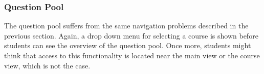 \subsubsection{Question Pool}

The question pool suffers from the same navigation problems described in the previous section. Again, a drop down menu for selecting a course is shown before students can see the overview of the question pool. Once more, students might think that access to this functionality is located near the main view or the course view, which is not the case.



